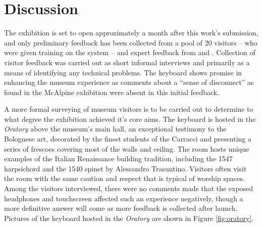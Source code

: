 \section{Discussion}\label{context}

The exhibition is set to open approximately a month after this work's submission, and only preliminary feedback has been collected from a pool of 20 visitors -- who were given training on the system -- and expert feedback from  and .
Collection of visitor feedback was carried out as short informal interviews and primarily as a means of identifying any technical problems.
The keyboard shows promise in enhancing the museum experience as comments about a ``sense of disconnect'' as found in the McAlpine exhibition \cite{McAlpine2014} were absent in this initial feedback.

A more formal surveying of museum visitors is to be carried out to determine to what degree the exhibition achieved it's core aims.
The keyboard is hosted in the \emph{Oratory} above the museum's main hall, an exceptional testimony to the Bolognese art, decorated by the finest students of the Carracci and presenting a series of frescoes covering most of the walls and ceiling. The room hosts unique examples of the Italian Renaissance building tradition, including the 1547 harpsichord and the 1540 spinet by Alessandro Trasuntino. Visitors often visit the room with the same caution and respect that is typical of worship spaces. Among the visitors interviewed, there were no comments made that the exposed headphones and touchscreen affected such an experience negatively, though a more definitive answer will come as more feedback is collected after launch. Pictures of the keyboard hosted in the \emph{Oratory} are shown in Figure \ref{fig:oratory}.

